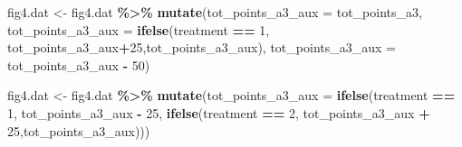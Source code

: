 \documentclass[
]{article}
\newenvironment{Shaded}{\begin{snugshade}}{\end{snugshade}}
\newcommand{\AttributeTok}[1]{\textcolor[rgb]{0.13,0.29,0.53}{#1}}
\newcommand{\DecValTok}[1]{\textcolor[rgb]{0.00,0.00,0.81}{#1}}
\newcommand{\FunctionTok}[1]{\textcolor[rgb]{0.13,0.29,0.53}{\textbf{#1}}}
\newcommand{\NormalTok}[1]{#1}
\newcommand{\OtherTok}[1]{\textcolor[rgb]{0.56,0.35,0.01}{#1}}
\newcommand{\SpecialCharTok}[1]{\textcolor[rgb]{0.81,0.36,0.00}{\textbf{#1}}}
\begin{document}
\begin{Shaded}
\begin{Highlighting}[]
\NormalTok{fig4.dat }\OtherTok{\textless{}{-}}\NormalTok{ fig4.dat }\SpecialCharTok{\%\textgreater{}\%}
  \FunctionTok{mutate}\NormalTok{(}\AttributeTok{tot\_points\_a3\_aux =}\NormalTok{ tot\_points\_a3,}
         \AttributeTok{tot\_points\_a3\_aux =} \FunctionTok{ifelse}\NormalTok{(treatment }\SpecialCharTok{==} \DecValTok{1}\NormalTok{, tot\_points\_a3\_aux}\SpecialCharTok{+}\DecValTok{25}\NormalTok{,tot\_points\_a3\_aux),}
         \AttributeTok{tot\_points\_a3\_aux =}\NormalTok{ tot\_points\_a3\_aux }\SpecialCharTok{{-}} \DecValTok{50}\NormalTok{)}

\NormalTok{fig4.dat }\OtherTok{\textless{}{-}}\NormalTok{ fig4.dat }\SpecialCharTok{\%\textgreater{}\%}
  \FunctionTok{mutate}\NormalTok{(}\AttributeTok{tot\_points\_a3\_aux =} \FunctionTok{ifelse}\NormalTok{(treatment }\SpecialCharTok{==} \DecValTok{1}\NormalTok{, tot\_points\_a3\_aux }\SpecialCharTok{{-}} \DecValTok{25}\NormalTok{,}
                                    \FunctionTok{ifelse}\NormalTok{(treatment }\SpecialCharTok{==} \DecValTok{2}\NormalTok{, tot\_points\_a3\_aux }\SpecialCharTok{+} \DecValTok{25}\NormalTok{,tot\_points\_a3\_aux)))}


\end{Highlighting}
\end{Shaded}
\end{document}
